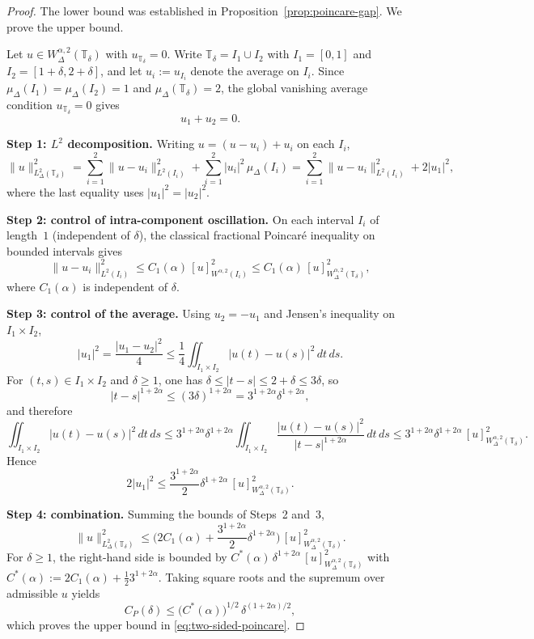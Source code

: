 \documentclass[10pt,a4paper]{amsart}
\begin{document}
\begin{proof}
The lower bound was established in Proposition~\ref{prop:poincare-gap}. 
We prove the upper bound.

Let $u \in W^{\alpha,2}_\Delta(\mathbb{T}_\delta)$ with 
$u_{\mathbb{T}_\delta} = 0$. Write $\mathbb{T}_\delta = I_1 \cup I_2$ with 
$I_1 = [0,1]$ and $I_2 = [1+\delta, 2+\delta]$, and let 
$u_i := u_{I_i}$ denote the average on $I_i$. Since 
$\mu_\Delta(I_1) = \mu_\Delta(I_2) = 1$ and $\mu_\Delta(\mathbb{T}_\delta) = 2$, 
the global vanishing average condition $u_{\mathbb{T}_\delta} = 0$ gives
\[
u_1 + u_2 = 0.
\]

\smallskip
\noindent\textbf{Step 1: $L^2$ decomposition.} Writing 
$u = (u - u_i) + u_i$ on each $I_i$,
\[
\|u\|^2_{L^2_\Delta(\mathbb{T}_\delta)} 
= \sum_{i=1}^2 \|u - u_i\|^2_{L^2(I_i)} + \sum_{i=1}^2 |u_i|^2 \, \mu_\Delta(I_i)
= \sum_{i=1}^2 \|u - u_i\|^2_{L^2(I_i)} + 2|u_1|^2,
\]
where the last equality uses $|u_1|^2 = |u_2|^2$.

\smallskip
\noindent\textbf{Step 2: control of intra-component oscillation.} On each 
interval $I_i$ of length~$1$ (independent of $\delta$), the classical 
fractional Poincar\'e inequality on bounded intervals gives
\[
\|u - u_i\|^2_{L^2(I_i)} 
\le C_1(\alpha) \, [u]^2_{W^{\alpha,2}(I_i)} 
\le C_1(\alpha) \, [u]^2_{W^{\alpha,2}_\Delta(\mathbb{T}_\delta)},
\]
where $C_1(\alpha)$ is independent of $\delta$.

\smallskip
\noindent\textbf{Step 3: control of the average.} Using $u_2 = -u_1$ and 
Jensen's inequality on $I_1 \times I_2$,
\[
|u_1|^2 = \frac{|u_1 - u_2|^2}{4} 
\le \frac{1}{4} \iint_{I_1 \times I_2} |u(t) - u(s)|^2 \, dt \, ds.
\]
For $(t,s) \in I_1 \times I_2$ and $\delta \ge 1$, one has 
$\delta \le |t-s| \le 2 + \delta \le 3\delta$, so
\[
|t-s|^{1+2\alpha} \le (3\delta)^{1+2\alpha} = 3^{1+2\alpha} \delta^{1+2\alpha},
\]
and therefore
\[
\iint_{I_1 \times I_2} |u(t) - u(s)|^2 \, dt \, ds 
\le 3^{1+2\alpha} \delta^{1+2\alpha} 
\iint_{I_1 \times I_2} \frac{|u(t) - u(s)|^2}{|t-s|^{1+2\alpha}} \, dt \, ds 
\le 3^{1+2\alpha} \delta^{1+2\alpha} \, [u]^2_{W^{\alpha,2}_\Delta(\mathbb{T}_\delta)}.
\]
Hence
\[
2|u_1|^2 \le \frac{3^{1+2\alpha}}{2} \delta^{1+2\alpha} \, 
[u]^2_{W^{\alpha,2}_\Delta(\mathbb{T}_\delta)}.
\]

\smallskip
\noindent\textbf{Step 4: combination.} Summing the bounds of Steps~2 and~3,
\[
\|u\|^2_{L^2_\Delta(\mathbb{T}_\delta)} 
\le \Big( 2 C_1(\alpha) + \frac{3^{1+2\alpha}}{2} \delta^{1+2\alpha} \Big) 
\, [u]^2_{W^{\alpha,2}_\Delta(\mathbb{T}_\delta)}.
\]
For $\delta \ge 1$, the right-hand side is bounded by 
$C^*(\alpha) \, \delta^{1+2\alpha} \, [u]^2_{W^{\alpha,2}_\Delta(\mathbb{T}_\delta)}$ 
with $C^*(\alpha) := 2 C_1(\alpha) + \tfrac{1}{2} 3^{1+2\alpha}$. Taking square 
roots and the supremum over admissible $u$ yields
\[
C_P(\delta) \le \big(C^*(\alpha)\big)^{1/2} \, \delta^{(1+2\alpha)/2},
\]
which proves the upper bound in \eqref{eq:two-sided-poincare}.
\end{proof}
\end{document}
